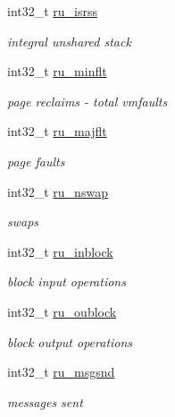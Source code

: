 \begin{DoxyCompactItemize}
int32\_\-t \hyperlink{structArmLinux32_1_1rusage_a40134842725bfde55684d65d4a30f05b}{ru\_\-isrss}
\begin{DoxyCompactList}\small\item\em integral unshared stack  \item\end{DoxyCompactList}\item 
int32\_\-t \hyperlink{structArmLinux32_1_1rusage_ae6c865bb6b3d060dc441ca6a93a7e107}{ru\_\-minflt}
\begin{DoxyCompactList}\small\item\em page reclaims -\/ total vmfaults \item\end{DoxyCompactList}\item 
int32\_\-t \hyperlink{structArmLinux32_1_1rusage_a85abd5c49926431a612dfbf239d6a428}{ru\_\-majflt}
\begin{DoxyCompactList}\small\item\em page faults \item\end{DoxyCompactList}\item 
int32\_\-t \hyperlink{structArmLinux32_1_1rusage_a2e028ef07873989257f0cb9021e977a0}{ru\_\-nswap}
\begin{DoxyCompactList}\small\item\em swaps \item\end{DoxyCompactList}\item 
int32\_\-t \hyperlink{structArmLinux32_1_1rusage_af1bde565c41a3d1e112903b8ae684ad7}{ru\_\-inblock}
\begin{DoxyCompactList}\small\item\em block input operations \item\end{DoxyCompactList}\item 
int32\_\-t \hyperlink{structArmLinux32_1_1rusage_ac5571605e8ae584a7640fb33c8300af0}{ru\_\-oublock}
\begin{DoxyCompactList}\small\item\em block output operations \item\end{DoxyCompactList}\item 
int32\_\-t \hyperlink{structArmLinux32_1_1rusage_a4b9d4803f4420e2e21ed4f7763bfbdbf}{ru\_\-msgsnd}
\begin{DoxyCompactList}\small\item\em messages sent \item\end{DoxyCompactList}\item 

\end{DoxyCompactItemize}
